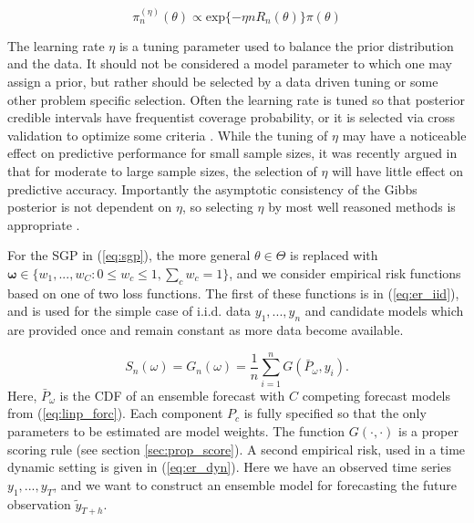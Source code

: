 \begin{equation}
    \label{eq:gibb_post}
    \pi^{(\eta)}_n (\theta) \propto \text{exp}\{-\eta n R_n(\theta)\} 
    \pi(\theta)
\end{equation}


The learning rate $\eta$ is a tuning parameter used to balance 
the prior distribution and the data. It should not be considered a 
model parameter to which one may assign a prior, but rather should be 
selected by a data driven tuning or some other problem specific selection. 
Often the learning rate is tuned so that posterior credible intervals have 
frequentist coverage probability, or it is selected via cross validation to 
optimize some criteria \cite[]{martin2022direct,syring2017gibbs,
bissiri2016general,zhang2006information}. 
While the tuning of $\eta$ may have a noticeable effect on predictive
performance for small sample sizes,
it was recently argued in \cite[]{mclatchie2025predictive} that for moderate
to large sample sizes, the selection of $\eta$ will have little effect on 
predictive accuracy.
Importantly the asymptotic 
consistency of the Gibbs posterior is not dependent on $\eta$, so selecting 
$\eta$ by most well reasoned methods is appropriate 
\cite[]{martin2022direct,loaiza2021focused}.







For the SGP in (\ref{eq:sgp}), the more general $\theta 
\in \Theta$ is replaced with 
$\boldsymbol{\omega} \in \{w_1, ..., w_C : 0 \leq w_c \leq 1, 
\sum_c w_c = 1\}$, and we consider empirical risk functions based on one of 
two loss 
functions. The first of these functions is in (\ref{eq:er_iid}), and is used 
for the simple case of i.i.d. data $y_1,..., y_n$ and candidate models which 
are provided once and remain constant as more data become available.

\begin{equation}
    S_n(\omega) = G_n(\omega) = \frac{1}{n}\sum_{i = 1}^n 
    G(\bar{P}_{\omega}, y_i).
    \label{eq:er_iid}
\end{equation}
Here, $\bar{P}_{\omega}$ is the CDF of an ensemble forecast with $C$ 
competing forecast models from (\ref{eq:linp_forc}). Each component $P_c$ 
is fully specified so that the only parameters to be estimated are model 
weights. The function $G(\cdot, \cdot)$ is a proper scoring rule 
(see section \ref{sec:prop_score}).
A second empirical risk, used in a time dynamic setting is given in 
(\ref{eq:er_dyn}). Here we have an observed time series $y_1, ..., y_T$, and 
we want to construct an ensemble model for forecasting the future observation 
$\tilde{y}_{T+h}$. 

